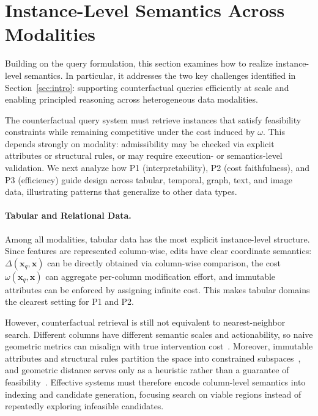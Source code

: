 \section{Instance-Level Semantics Across Modalities}
\label{sec:instance}
Building on the query formulation, this section examines how to realize instance-level semantics. In particular, it addresses the two key challenges identified in Section~\ref{sec:intro}: supporting counterfactual queries efficiently at scale and enabling principled reasoning across heterogeneous data modalities. 

The counterfactual query system must retrieve instances that satisfy feasibility constraints while remaining competitive under the cost induced by $\omega$. This depends strongly on modality: admissibility may be checked via explicit attributes or structural rules, or may require execution- or semantics-level validation. We next analyze how P1 (interpretability), P2 (cost faithfulness), and P3 (efficiency) guide design across tabular, temporal, graph, text, and image data, illustrating patterns that generalize to other data types.

\paragraph{Tabular and Relational Data.}
Among all modalities, tabular data has the most explicit instance-level structure. Since features are represented column-wise, edits have clear coordinate semantics: $\Delta(\mathbf{x}_q,\mathbf{x})$ can be directly obtained via column-wise comparison, the cost $\omega(\mathbf{x}_q,\mathbf{x})$ can aggregate per-column modification effort, and immutable attributes can be enforced by assigning infinite cost. This makes tabular domains the clearest setting for P1 and P2. 

However, counterfactual retrieval is still not equivalent to nearest-neighbor search. Different columns have different semantic scales and actionability, so naive geometric metrics can misalign with true intervention cost~\cite{karabulut2019weighted}. Moreover, immutable attributes and structural rules partition the space into constrained subspaces~\cite{galhotra2022hyper}, and geometric distance serves only as a heuristic rather than a guarantee of feasibility~\cite{bartal2011fast}. Effective systems must therefore encode column-level semantics into indexing and candidate generation, focusing search on viable regions instead of repeatedly exploring infeasible candidates.

